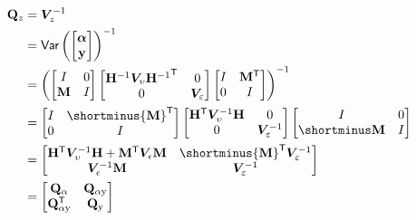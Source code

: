 \documentclass[notitlepage,a4paper,12pt]{article}
\newcommand{\transpose}[1]{{#1}^{\sf{T}}}
\begin{document}
\begin{align*}
    \mathbf{Q}_z 
    &= 
    \bm{V}^{-1}_z \\
    &= 
    \text{\sf{Var}}\left(
    \begin{bmatrix}
        \boldsymbol{\alpha} \\
        \mathbf{y}
    \end{bmatrix}
    \right)^{-1} \\
    &=  
    \left(
    \begin{bmatrix}
        I & 0 \\
        \mathbf{M} & I
    \end{bmatrix}
    \begin{bmatrix}
        \mathbf{H}^{-1} \bm{V}_{\upsilon} \transpose{\mathbf{H}^{-1}} & 0 \\
        0 & \bm{V}_{\varepsilon}
    \end{bmatrix} 
    \begin{bmatrix}
        I & \transpose{\mathbf{M}} \\
        0 & I
    \end{bmatrix}
    \right)^{-1}\\
    &=
    \begin{bmatrix}
        I & \shortminus\transpose{\mathbf{M}} \\
        0 & I
    \end{bmatrix}
    \begin{bmatrix}
        \transpose{\mathbf{H}} \bm{V}^{-1}_{\upsilon} \mathbf{H} & 0 \\
        0 & \bm{V}^{-1}_{\varepsilon}
    \end{bmatrix} 
    \begin{bmatrix}
        I & 0 \\
        \shortminus\mathbf{M} & I 
    \end{bmatrix} \\
    &=
    \begin{bmatrix}
         \transpose{\mathbf{H}} \bm{V}^{-1}_{\upsilon} \mathbf{H} + \transpose{\mathbf{M}}\bm{V}_{\epsilon}\mathbf{M}  & \shortminus \transpose{\mathbf{M}} \bm{V}^{-1}_{\varepsilon} \\
         \bm{V}^{-1}_{\epsilon} \mathbf{M} & \bm{V}^{-1}_{\varepsilon}
    \end{bmatrix} \\
    &= 
    \begin{bmatrix}
        \mathbf{Q}_{\alpha} & \mathbf{Q}_{\alpha\text{y}} \\
        \transpose{\mathbf{Q}}_{\alpha \text{y}} & \mathbf{Q}_{\text{y}}  
    \end{bmatrix}
\end{align*}
\end{document}
